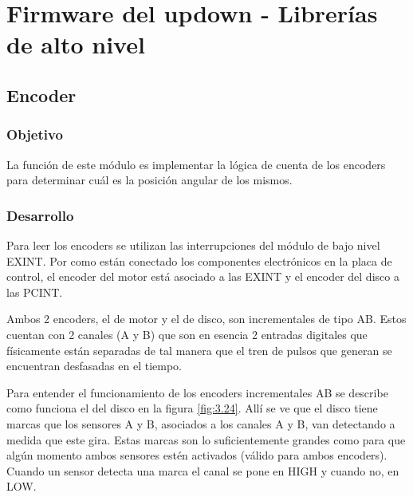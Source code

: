 \section{Firmware del updown - Librerías de alto nivel} \label{sec:\thesection}

\subsection{Encoder}
\subsubsection{Objetivo}
La función de este módulo es implementar la lógica de cuenta de los encoders para determinar cuál es la posición angular de los mismos.

\subsubsection{Desarrollo}
Para leer los encoders se utilizan las interrupciones del módulo de bajo nivel EXINT. Por como están conectado los componentes electrónicos en la placa de control, el encoder del motor está asociado a las EXINT y el encoder del disco a las PCINT.

Ambos 2 encoders, el de motor y el de disco, son incrementales de tipo AB. Estos cuentan con 2 canales (A y B) que son en esencia 2 entradas digitales que físicamente están separadas de tal manera que el tren de pulsos que generan se encuentran desfasadas en el tiempo. 

Para entender el funcionamiento de los encoders incrementales AB se describe como funciona el del disco en la figura \ref{fig:3.24}. Allí se ve que el disco tiene marcas que los sensores A y B, asociados a los canales A y B, van detectando a medida que este gira. Estas marcas son lo suficientemente grandes como para que algún momento ambos sensores estén activados (válido para ambos encoders). Cuando un sensor detecta una marca el canal se pone en HIGH y cuando no, en LOW.

